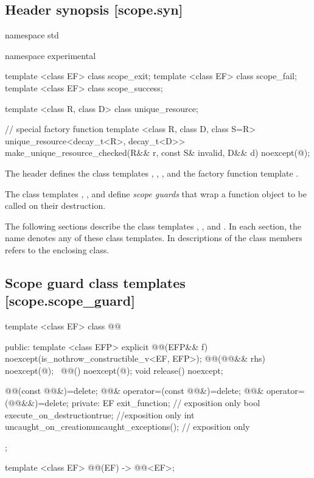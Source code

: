 \documentclass[ebook,11pt,article]{memoir}
\begin{document}
\subsection{Header  synopsis [scope.syn]}


\begin{codeblock}
namespace std {
namespace experimental {
template <class EF>
  class scope_exit;
template <class EF>
  class scope_fail;
template <class EF>
  class scope_success;

template <class R, class D>
  class unique_resource;

// special factory function
template <class R, class D, class S=R>
  unique_resource<decay_t<R>, decay_t<D>>
  make_unique_resource_checked(R&& r, const S& invalid, D&& d) noexcept(@\seebelow@);
}}
\end{codeblock}

\pnum
The header   defines the class templates , , ,  and
the factory function template .

\pnum 
The class templates , , and  define\emph{ scope guards} that wrap a function object to be called on their destruction.

\pnum
The following sections describe the class templates , , and . In each section, the name  denotes any of these class templates. In descriptions of the class members  refers to the enclosing class.

\newpage
\subsection {Scope guard class templates [scope.scope_guard]}

\begin{codeblock}
template <class EF>
class @@ {
public:
  template <class EFP>
  explicit @@(EFP&& f) 
  noexcept(is_nothrow_constructible_v<EF, EFP>);
  @@(@@&& rhs) noexcept(@\seebelow@);
  ~@@() noexcept(@\seebelow@);
  void release() noexcept;

  @@(const @@&)=delete;
  @@& operator=(const @@&)=delete;
  @@& operator=(@@&&)=delete;
private:
  EF exit_function;    // exposition only
  bool execute_on_destruction{true}; //exposition only
  int  uncaught_on_creation{uncaught_exceptions()}; // exposition only
};

template <class EF>
@@(EF) -> @@<EF>;

\end{codeblock}
\end{document}
